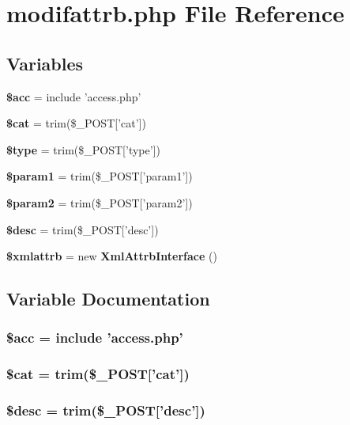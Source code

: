 \section{modifattrb.php File Reference}
\label{modifattrb_8php}


\subsection*{Variables}
\begin{CompactItemize}
\item 
{\bf \$acc} = include 'access.php'
\item 
{\bf \$cat} = trim(\$\_\-POST['cat'])
\item 
{\bf \$type} = trim(\$\_\-POST['type'])
\item 
{\bf \$param1} = trim(\$\_\-POST['param1'])
\item 
{\bf \$param2} = trim(\$\_\-POST['param2'])
\item 
{\bf \$desc} = trim(\$\_\-POST['desc'])
\item 
{\bf \$xmlattrb} = new {\bf Xml\-Attrb\-Interface} ()
\end{CompactItemize}


\subsection{Variable Documentation}
\subsubsection{\setlength{\rightskip}{0pt plus 5cm}\$acc = include 'access.php'}\label{modifattrb_8php_542926c588a05eb69553d79c83cf73da}


\subsubsection{\setlength{\rightskip}{0pt plus 5cm}\$cat = trim(\$\_\-POST['cat'])}\label{modifattrb_8php_9e05c34c5aba2b3a1fcaadefe6f172eb}


\subsubsection{\setlength{\rightskip}{0pt plus 5cm}\$desc = trim(\$\_\-POST['desc'])}\label{modifattrb_8php_31059b9e4d0c5af34df20da32232ea9a}


